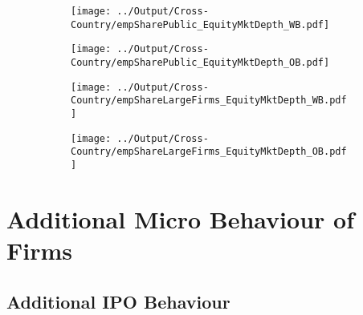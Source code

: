 \documentclass[12pt,notitlepage]{article}
\begin{document}
\begin{figure}[!htpb]
\centering
\caption{Share of Employment in Public Firms}
\begin{subfigure}{.49\textwidth}
    \centering
 \texttt{[image: ../Output/Cross-Country/empSharePublic\_EquityMktDepth\_WB.pdf]}
\end{subfigure}
\begin{subfigure}{.49\textwidth}
    \centering
  \texttt{[image: ../Output/Cross-Country/empSharePublic\_EquityMktDepth\_OB.pdf]}
\end{subfigure}
\end{figure}
\FloatBarrier


\begin{figure}[!htpb]
\centering
\caption{Share of Employment in Large Firms}
\begin{subfigure}{.49\textwidth}
    \centering
 \texttt{[image: ../Output/Cross-Country/empShareLargeFirms\_EquityMktDepth\_WB.pdf]}
\end{subfigure}
\begin{subfigure}{.49\textwidth}
    \centering
  \texttt{[image: ../Output/Cross-Country/empShareLargeFirms\_EquityMktDepth\_OB.pdf]}
\end{subfigure}
\end{figure}
\FloatBarrier


\FloatBarrier
\section{Additional Micro Behaviour of Firms} %
\label{sec:additional_micro_behaviour_of_firms}
\FloatBarrier


\subsection{Additional IPO Behaviour} %
\label{sec:additional_ipo_behaviour}
\end{document}
